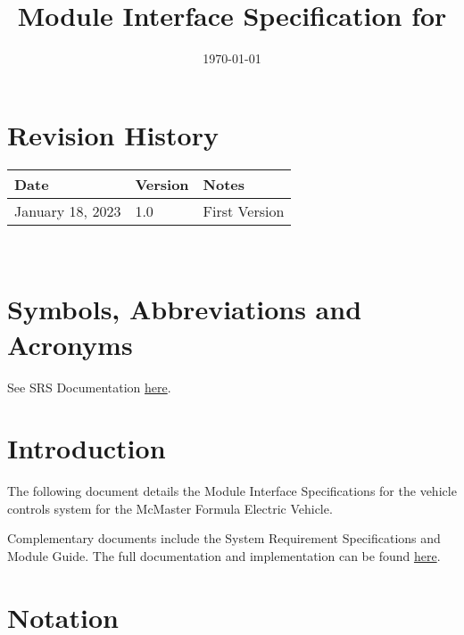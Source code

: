 \documentclass[12pt, titlepage]{article}
\begin{document}
\title{Module Interface Specification for \progname{}}

\author{\authname}

\date{\today}

\maketitle


\section*{Revision History}

\begin{tabularx}{\textwidth}{p{3cm}p{2cm}X}
\toprule {\bf Date} & {\bf Version} & {\bf Notes}\\
\midrule
January 18, 2023 & 1.0 & First Version\\
\bottomrule
\end{tabularx}

~\newpage

\section*{Symbols, Abbreviations and Acronyms}

See SRS Documentation \href{https://github.com/Dharakverma/vehicle_control_system/blob/main/docs/SRS/SRS.pdf}{here}.

\newpage

\tableofcontents

\newpage


\section{Introduction}

The following document details the Module Interface Specifications for the vehicle controls system for the McMaster Formula Electric Vehicle.

Complementary documents include the System Requirement Specifications
and Module Guide.  The full documentation and implementation can be
found \href{https://github.com/Dharakverma/vehicle_control_system}{here}.

\section{Notation}
\end{document}
